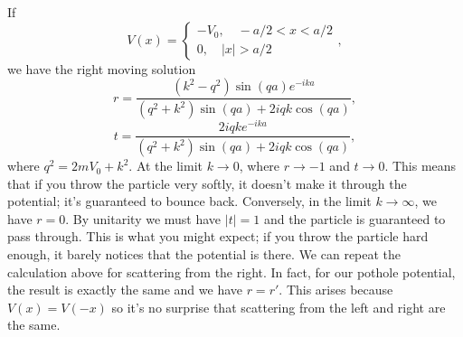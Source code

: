 \begin{example}
If
\[V(x) = \begin{cases} -V_0  , \quad -a/2 < x < a/2 \\ 0 , \quad |x| > a/2 \end{cases},\]
we have the right moving solution
\[r = \frac{(k^2-q^2)\sin(qa)e^{-ika}}{(q^2+k^2)\sin(qa) + 2iqk\cos(qa)},\]
\[t = \frac{2iqke^{-ika}}{(q^2+k^2)\sin(qa) + 2iqk\cos(qa)},\]
where $q^2 = 2mV_0 + k^2$. At the limit $k \to 0$, where $r \to -1$ and $t \to 0$. This means that if you throw the particle very softly, it doesn't make it through the potential; it's guaranteed to bounce back. Conversely, in the limit $k \to \infty$, we have $r = 0$. By unitarity we must have $|t| = 1$ and the particle is guaranteed to pass through. This is what you might expect; if you throw the particle hard enough, it barely notices that the potential is there.
We can repeat the calculation above for scattering from the right. In fact, for our pothole potential, the result is exactly the same and we have $r = r'$. This arises because $V (x) = V (-x)$ so it's no surprise that scattering from the left and right are the same.
\end{example}

